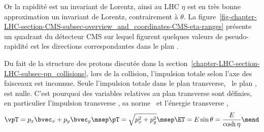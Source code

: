 Or la rapidité est un invariant de Lorentz, ainsi au LHC $\eta$ est en très bonne approximation un invariant de Lorentz, contrairement à $\theta$.
La figure~\ref{fig-chapter-LHC-section-CMS-subsec-overview_and_coordinates-CMS-eta-ranges} présente un quadrant du détecteur CMS sur lequel figurent quelques valeurs de pseudo-rapidité est les directions correspondantes dans le plan .
\par Du fait de la structure des protons discutée dans la section~\ref{chapter-LHC-section-LHC-subsec-pp_collisions}, lors de la collision, l'impulsion totale selon l'axe des faisceaux est inconnue.
Seule l'impulsion totale dans le plan transverse, \ie\ le plan , est nulle.
C'est pourquoi des variables relatives au plan transverse sont définies, en particulier l'impulsion transverse \vpT, sa norme \pT\ et l'énergie transverse \ET,
\begin{equation}
\vpT = p_x\bvec_x + p_y\bvec_y
\msep
\pT = \sqrt{p_x^2+p_y^2}
\msep
\ET = E\sin\theta = \frac{E}{\cosh\eta}
\mend
\end{equation}